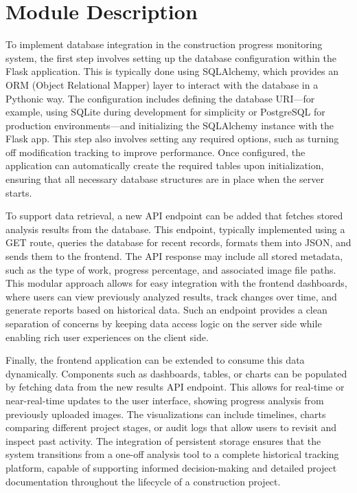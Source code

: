 \documentclass[12pt,a4paper]{report}
\begin{document}
\section{Module Description}
To implement database integration in the construction progress monitoring system, the first step involves setting up the database configuration within the Flask application. This is typically done using SQLAlchemy, which provides an ORM (Object Relational Mapper) layer to interact with the database in a Pythonic way. The configuration includes defining the database URI—for example, using SQLite during development for simplicity or PostgreSQL for production environments—and initializing the SQLAlchemy instance with the Flask app. This step also involves setting any required options, such as turning off modification tracking to improve performance. Once configured, the application can automatically create the required tables upon initialization, ensuring that all necessary database structures are in place when the server starts.

To support data retrieval, a new API endpoint can be added that fetches stored analysis results from the database. This endpoint, typically implemented using a GET route, queries the database for recent records, formats them into JSON, and sends them to the frontend. The API response may include all stored metadata, such as the type of work, progress percentage, and associated image file paths. This modular approach allows for easy integration with the frontend dashboards, where users can view previously analyzed results, track changes over time, and generate reports based on historical data. Such an endpoint provides a clean separation of concerns by keeping data access logic on the server side while enabling rich user experiences on the client side.

Finally, the frontend application can be extended to consume this data dynamically. Components such as dashboards, tables, or charts can be populated by fetching data from the new results API endpoint. This allows for real-time or near-real-time updates to the user interface, showing progress analysis from previously uploaded images. The visualizations can include timelines, charts comparing different project stages, or audit logs that allow users to revisit and inspect past activity. The integration of persistent storage ensures that the system transitions from a one-off analysis tool to a complete historical tracking platform, capable of supporting informed decision-making and detailed project documentation throughout the lifecycle of a construction project.
\end{document}
